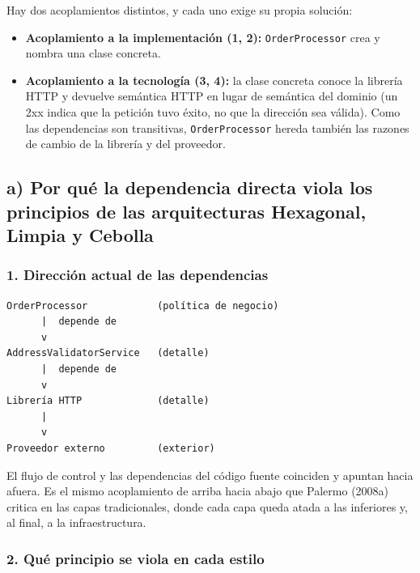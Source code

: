 \documentclass[11pt,a4paper]{article}
\begin{document}
Hay dos acoplamientos distintos, y cada uno exige su propia solución:

\begin{itemize}[leftmargin=1.4em]
\item \textbf{Acoplamiento a la implementación (1, 2):} \texttt{OrderProcessor} crea y nombra
una clase concreta.
\item \textbf{Acoplamiento a la tecnología (3, 4):} la clase concreta conoce la librería HTTP y
devuelve semántica HTTP en lugar de semántica del dominio (un 2xx indica que la petición tuvo
éxito, no que la dirección sea válida). Como las dependencias son transitivas,
\texttt{OrderProcessor} hereda también las razones de cambio de la librería y del proveedor.
\end{itemize}

\subsection*{a) Por qué la dependencia directa viola los principios de las arquitecturas Hexagonal, Limpia y Cebolla}

\subsubsection*{1. Dirección actual de las dependencias}

\noindent\begin{minipage}{\linewidth}
\begin{lstlisting}
OrderProcessor            (política de negocio)
      |  depende de
      v
AddressValidatorService   (detalle)
      |  depende de
      v
Librería HTTP             (detalle)
      |
      v
Proveedor externo         (exterior)
\end{lstlisting}
\end{minipage}

El flujo de control y las dependencias del código fuente coinciden y apuntan hacia afuera. Es
el mismo acoplamiento de arriba hacia abajo que Palermo (2008a) critica en las capas
tradicionales, donde cada capa queda atada a las inferiores y, al final, a la infraestructura.

\subsubsection*{2. Qué principio se viola en cada estilo}
\end{document}
